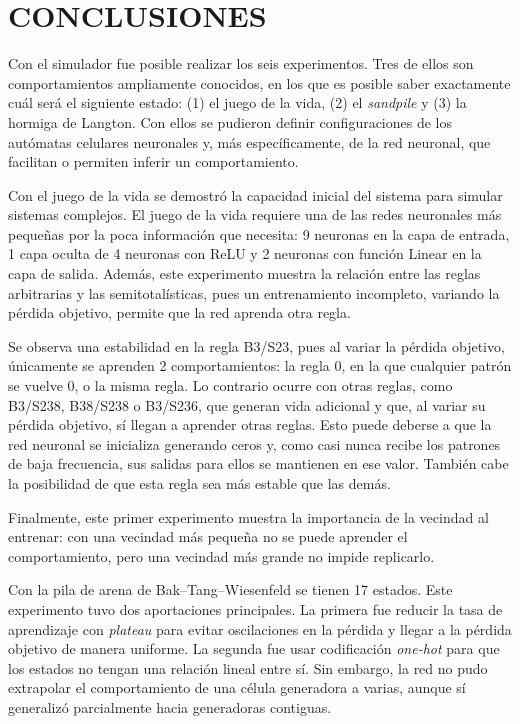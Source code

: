 \section{CONCLUSIONES}

Con el simulador fue posible realizar los seis experimentos. Tres de ellos son comportamientos ampliamente conocidos, en los que es posible saber exactamente cuál será el siguiente estado: (1) el juego de la vida, (2) el \textit{sandpile} y (3) la hormiga de Langton. Con ellos se pudieron definir configuraciones de los autómatas celulares neuronales y, más específicamente, de la red neuronal, que facilitan o permiten inferir un comportamiento.


Con el juego de la vida se demostró la capacidad inicial del sistema para simular sistemas complejos. El juego de la vida requiere una de las redes neuronales más pequeñas por la poca información que necesita: 9 neuronas en la capa de entrada, 1 capa oculta de 4 neuronas con ReLU y 2 neuronas con función Linear en la capa de salida. Además, este experimento muestra la relación entre las reglas arbitrarias y las semitotalísticas, pues un entrenamiento incompleto, variando la pérdida objetivo, permite que la red aprenda otra regla.

Se observa una estabilidad en la regla B3/S23, pues al variar la pérdida objetivo, únicamente se aprenden 2 comportamientos: la regla 0, en la que cualquier patrón se vuelve 0, o la misma regla. Lo contrario ocurre con otras reglas, como B3/S238, B38/S238 o B3/S236, que generan vida adicional y que, al variar su pérdida objetivo, sí llegan a aprender otras reglas. Esto puede deberse a que la red neuronal se inicializa generando ceros y, como casi nunca recibe los patrones de baja frecuencia, sus salidas para ellos se mantienen en ese valor. También cabe la posibilidad de que esta regla sea más estable que las demás.

Finalmente, este primer experimento muestra la importancia de la vecindad al entrenar: con una vecindad más pequeña no se puede aprender el comportamiento, pero una vecindad más grande no impide replicarlo.

Con la pila de arena de Bak–Tang–Wiesenfeld se tienen 17 estados. Este experimento tuvo dos aportaciones principales. La primera fue reducir la tasa de aprendizaje con \textit{plateau} para evitar oscilaciones en la pérdida y llegar a la pérdida objetivo de manera uniforme. La segunda fue usar codificación \textit{one-hot} para que los estados no tengan una relación lineal entre sí. Sin embargo, la red no pudo extrapolar el comportamiento de una célula generadora a varias, aunque sí generalizó parcialmente hacia generadoras contiguas.

